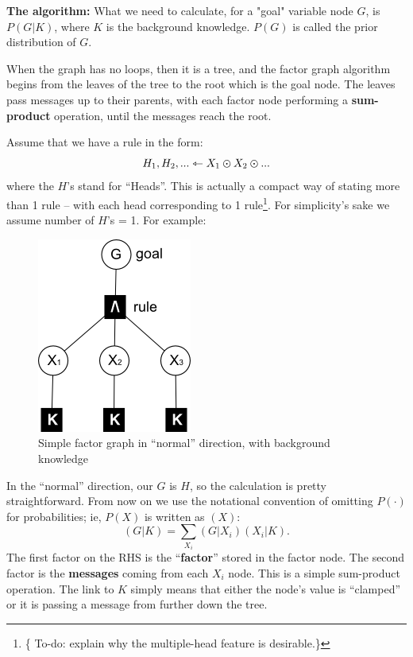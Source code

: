 \textbf{The algorithm:}  What we need to calculate, for a "goal" variable node $G$, is $P(G|K)$, where $K$ is the background knowledge.  $P(G)$ is called the prior distribution of $G$.

When the graph has no loops, then it is a tree, and the factor graph algorithm begins from the leaves of the tree to the root which is the goal node.  The leaves pass messages up to their parents, with each factor node performing a \textbf{sum-product} operation, until the messages reach the root.

Assume that we have a rule in the form:
\begin{equation}
H_1, H_2, ... \leftarrowtriangle X_1 \varodot X_2 \varodot ...
\end{equation}
where the $H$'s stand for ``Heads''.  This is actually a compact way of stating more than 1 rule -- with each head corresponding to 1 rule\footnote{\{ To-do: explain why the multiple-head feature is desirable.\}}.  For simplicity's sake we assume number of $H$'s = 1.  For example:
\begin{figure}[H]
\centering
\includegraphics{simple-proof-tree2.png}
\caption{Simple factor graph in ``normal'' direction, with background knowledge}
\end{figure}

In the ``normal'' direction, our $G$ is $H$, so the calculation is pretty straightforward.  From now on we use the notational convention of omitting $P(\cdot)$ for probabilities; ie, $P(X)$ is written as $(X)$:
\begin{equation}
(G|K) = \sum_{X_i} (G|X_i)(X_i|K).
\end{equation}
The first factor on the RHS is the ``\textbf{factor}'' stored in the factor node.  The second factor is the \textbf{messages} coming from each $X_i$ node.  This is a simple sum-product operation.  The link to $K$ simply means that either the node's value is ``clamped'' or it is passing a message from further down the tree.

